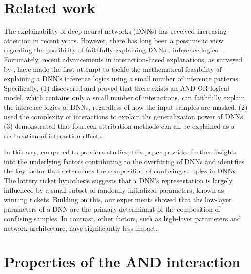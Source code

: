 \documentclass[10pt,twocolumn,letterpaper]{article}
\begin{document}



\newpage
\appendix
\onecolumn

\section{Related work}

The explainability of deep neural networks (DNNs) has received increasing attention in recent years. However, there has long been a pessimistic view regarding the possibility of faithfully explaining DNNs's inference logics~\citep{dziugaite2017computing, foret2020sharpness, neyshabur2015norm}. Fortunately, recent advancements in interaction-based explanations, as surveyed by \cite{ren2024we}, have made the first attempt to tackle the mathematical feasibility of explaining a DNN's inference logics using a small number of inference patterns. Specifically, (1) \citet{ren2023defining} discovered and \cite{ren2024we} proved that there exists an AND-OR logical model, which contains only a small number of interactions, can faithfully explain the inference logics of DNNs, regardless of how the input samples are masked. (2) \citet{zhou2024explaining} used the complexity of interactions to explain the generalization power of DNNs. (3) \citet{deng2024unifying} demonstrated that fourteen attribution methods can all be explained as a reallocation of interaction effects.

In this way, compared to previous studies, this paper provides further insights into the underlying factors contributing to the overfitting of DNNs and identifies the key factor that determines the composition of confusing samples in DNNs. The lottery ticket hypothesis\cite{frankle2018lottery} suggests that a DNN's representation is largely influenced by a small subset of randomly initialized parameters, known as winning tickets. Building on this, our experiments showed that the low-layer parameters of a DNN are the primary determinant of the composition of confusing samples. In contrast, other factors, such as high-layer parameters and network architecture, have significantly less impact.


\section{Properties of the AND interaction}
\label{sec:apdx-property-harsanyi}
\end{document}
